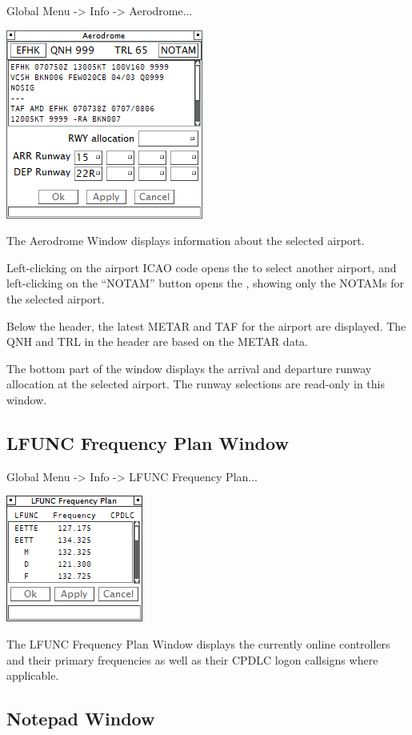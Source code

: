 \documentclass[11pt,a4paper,oldfontcommands]{memoir}
\begin{document}
Global Menu -> Info -> Aerodrome...

\includegraphics{img/adinfo.png}

The Aerodrome Window displays information about the selected airport.

Left-clicking on the airport ICAO code opens the \textit{} to select another airport, and left-clicking on the “NOTAM” button opens the \textit{}, showing only the NOTAMs for the selected airport.

Below the header, the latest METAR and TAF for the airport are displayed. The QNH and TRL in the header are based on the METAR data.

The bottom part of the window displays the arrival and departure runway allocation at the selected airport. The runway selections are read-only in this window.

\subsection{LFUNC Frequency Plan Window}
\label{win:lfunc}

Global Menu -> Info -> LFUNC Frequency Plan...

\includegraphics{img/lfunc.png}

The LFUNC Frequency Plan Window displays the currently online controllers and their primary frequencies as well as their CPDLC logon callsigns where applicable.

\subsection{Notepad Window}
\label{win:note}
\end{document}
